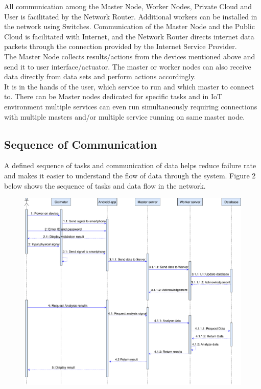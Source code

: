 \documentclass[AMA,STIX1COL]{WileyNJD-v2}
\begin{document}
All communication among the Master Node, Worker Nodes, Private Cloud and User is facilitated by the Network Router. Additional workers can be installed in the network using Switches. Communication of the Master Node and the Public Cloud is facilitated with Internet, and the Network Router directs internet data packets through the connection provided by the Internet Service Provider.\\
The Master Node collects results/actions from the devices mentioned above and send it to user interface/actuator. The master or worker nodes can also receive data directly from data sets and perform actions accordingly. \\
It is in the hands of the user, which service to run and which master to connect to. There can be Master nodes dedicated for specific tasks and in IoT environment multiple services can even run simultaneously requiring connections with multiple masters and/or multiple service running on same master node. 

\subsection{Sequence of Communication}
A defined sequence of tasks and communication of data helps reduce failure rate and makes it easier to understand the flow of data through the system. Figure 2 below shows the sequence of tasks and data flow in the network.
\begin{figure}[h]
\centering
\includegraphics[width=12cm]{sequence}
\end{figure}
\end{document}
